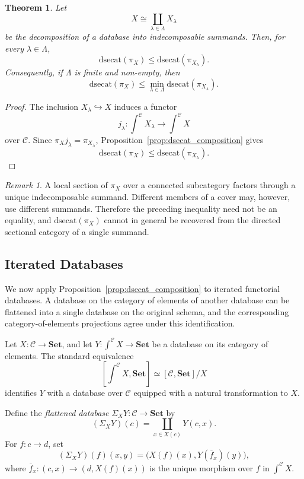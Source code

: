 \documentclass[12pt]{amsart}
\newtheorem{theorem}[teo]{Theorem}
\theoremstyle{definition}
\theoremstyle{remark}
\newtheorem{remark}{Remark}
\numberwithin{figure}{section}%
\newcommand{\CC}{\mathcal{C}}
\newcommand{\Sets}{\mathbf{Set}}
\begin{document}
\begin{theorem}\label{prop:dsecat_indecomposable_summands}
Let
\[
X\cong\coprod_{\lambda\in\Lambda}X_\lambda
\]
be the decomposition of a database into indecomposable summands. Then, for
every \(\lambda\in\Lambda\),
\[
\mathrm{dsecat}(\pi_X)
\leq
\mathrm{dsecat}(\pi_{X_\lambda}).
\]
Consequently, if \(\Lambda\) is finite and non-empty, then
\[
\mathrm{dsecat}(\pi_X)
\leq
\min_{\lambda\in\Lambda}
\mathrm{dsecat}(\pi_{X_\lambda}).
\]
\end{theorem}

\begin{proof}
The inclusion \(X_\lambda\hookrightarrow X\) induces a functor
\[
j_\lambda\colon
\int^\CC X_\lambda
\longrightarrow
\int^\CC X
\]
over \(\CC\). Since
\(\pi_Xj_\lambda=\pi_{X_\lambda}\),
Proposition~\ref{prop:dsecat_composition} gives
\[
\mathrm{dsecat}(\pi_X)
\leq
\mathrm{dsecat}(\pi_{X_\lambda}).
\]
\end{proof}

\begin{remark}
A local section of \(\pi_X\) over a connected subcategory factors through
a unique indecomposable summand. Different members of a cover may,
however, use different summands. Therefore the preceding inequality need
not be an equality, and \(\mathrm{dsecat}(\pi_X)\) cannot in general be
recovered from the directed sectional category of a single summand.
\end{remark}

\subsection{Iterated Databases}\label{subsec:iterated}

We now apply Proposition~\ref{prop:dsecat_composition} to iterated
functorial databases. A database on the category of elements of another
database can be flattened into a single database on the original schema,
and the corresponding category-of-elements projections agree under this
identification.

Let \(X\colon\CC\to\Sets\), and let
\(Y\colon\int^\CC X\to\Sets\) be a database on its category of elements.
The standard equivalence
\[
\left[\int^\CC X,\Sets\right]
\simeq
[\CC,\Sets]/X
\]
identifies \(Y\) with a database over \(\CC\) equipped with a natural
transformation to \(X\).

Define the \emph{flattened database}
\(\Sigma_XY\colon\CC\to\Sets\) by
\[
(\Sigma_XY)(c)
=
\coprod_{x\in X(c)}Y(c,x).
\]
For \(f\colon c\to d\), set
\[
(\Sigma_XY)(f)(x,y)
=
\bigl(X(f)(x),Y(\overline f_x)(y)\bigr),
\]
where
\(\overline f_x\colon(c,x)\to(d,X(f)(x))\) is the unique morphism over
\(f\) in \(\int^\CC X\).
\end{document}

